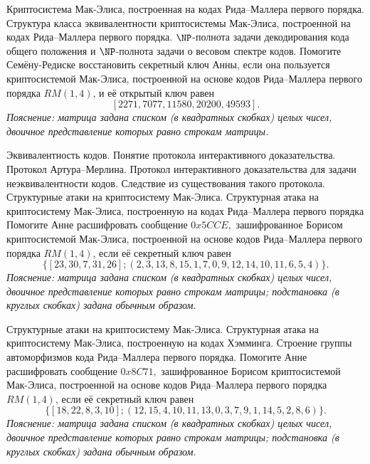 \begin{questions}
    \question
        Криптосистема Мак-Элиса, построенная на кодах Рида--Маллера первого порядка.
        Структура класса эквивалентности криптосистемы Мак-Элиса, построенной на кодах Рида--Маллера первого порядка.
    \question
        \(\NP\)-полнота задачи декодирования кода общего положения и \(\NP\)-полнота задачи о весовом спектре кодов.
    \question
        Помогите Семёну-Редиске восстановить секретный ключ Анны, если она пользуется криптосистемой Мак-Элиса, построенной на основе кодов Рида--Маллера первого порядка \(RM(1, 4)\), и её открытый ключ равен 
        \[[2271, 7077, 11580, 20200, 49593].\]
        \emph{Пояснение: матрица задана списком (в квадратных скобках) целых чисел, двоичное представление которых равно строкам матрицы.}
\end{questions}


\begin{questions}
    \question
        Эквивалентность кодов.
        Понятие протокола интерактивного доказательства.
        Протокол Артура--Мерлина.
        Протокол интерактивного доказательства для задачи неэквивалентности кодов.
        Следствие из существования такого протокола.
    \question
        Структурные атаки на криптосистему Мак-Элиса.
        Структурная атака на криптосистему Мак-Элиса, построенную на кодах Рида--Маллера первого порядка
    \question
        Помогите Анне расшифровать сообщение \(0x5CCE,\) зашифрованное Борисом криптосистемой Мак-Элиса, построенной на основе кодов Рида--Маллера первого порядка \(RM(1,4)\), если её секретный ключ равен \[\{[23, 30, 7, 31, 26]; (2, 3, 13, 8, 15, 1, 7, 0, 9, 12, 14, 10, 11, 6, 5, 4)\}.\]
        \emph{Пояснение: матрица задана списком (в квадратных скобках) целых чисел, двоичное представление которых равно строкам матрицы; подстановка (в круглых скобках) задана обычным образом.}
\end{questions}


\begin{questions}
    \question
        Структурные атаки на криптосистему Мак-Элиса.
        Структурная атака на криптосистему Мак-Элиса, построенную на кодах Хэмминга.
    \question
        Строение группы автоморфизмов кода Рида--Маллера первого порядка.
    \question
        Помогите Анне расшифровать сообщение \(0x8C71,\) зашифрованное Борисом криптосистемой Мак-Элиса, построенной на основе кодов Рида--Маллера первого порядка \(RM(1,4)\), если её секретный ключ равен \[\{[18, 22, 8, 3, 10]; (12, 15, 4, 10, 11, 13, 0, 3, 7, 9, 1, 14, 5, 2, 8, 6)\}.\]
        \emph{Пояснение: матрица задана списком (в квадратных скобках) целых чисел, двоичное представление которых равно строкам матрицы; подстановка (в круглых скобках) задана обычным образом.}
\end{questions}


